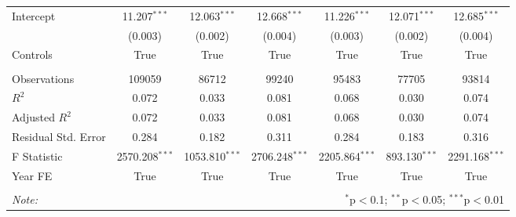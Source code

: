 \begin{tabular}{@{\extracolsep{5pt}}lcccccc}
Intercept & 11.207$^{***}$ & 12.063$^{***}$ & 12.668$^{***}$ & 11.226$^{***}$ & 12.071$^{***}$ & 12.685$^{***}$ \\
& (0.003) & (0.002) & (0.004) & (0.003) & (0.002) & (0.004) \\
Controls & True & True & True & True & True & True \\
\hline \\[-1.8ex]
 Observations & 109059 & 86712 & 99240 & 95483 & 77705 & 93814 \\
 $R^2$ & 0.072 & 0.033 & 0.081 & 0.068 & 0.030 & 0.074 \\
 Adjusted $R^2$ & 0.072 & 0.033 & 0.081 & 0.068 & 0.030 & 0.074 \\
 Residual Std. Error & 0.284  & 0.182  & 0.311  & 0.284  & 0.183  & 0.316  \\
 F Statistic & 2570.208$^{***}$  & 1053.810$^{***}$  & 2706.248$^{***}$  & 2205.864$^{***}$  & 893.130$^{***}$  & 2291.168$^{***}$  \\
 Year FE & True & True & True & True & True & True \\
\hline
\hline \\[-1.8ex]
\textit{Note:} & \multicolumn{6}{r}{$^{*}$p$<$0.1; $^{**}$p$<$0.05; $^{***}$p$<$0.01} \\
\end{tabular}
